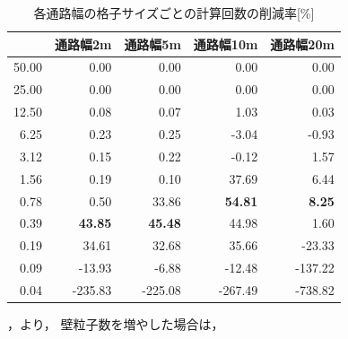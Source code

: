 %
\begin{table}[tb]
  \centering
  \caption{各通路幅の格子サイズごとの計算回数の削減率[\%]}
  \label{tb:5_times_sakugenritu}
    \begin{tabular}{r|r|r|r|r}
    \hline \hline
              & 通路幅2m       & 通路幅5m       & 通路幅10m      & 通路幅20m     \\ \hline
        50.00 & 0.00           & 0.00           & 0.00           & 0.00          \\ \hline
        25.00 & 0.00           & 0.00           & 0.00           & 0.00          \\ \hline
        12.50 & 0.08           & 0.07           & 1.03           & 0.03          \\ \hline
        6.25  & 0.23           & 0.25           & -3.04          & -0.93         \\ \hline
        3.12  & 0.15           & 0.22           & -0.12          & 1.57          \\ \hline
        1.56  & 0.19           & 0.10           & 37.69          & 6.44          \\ \hline
        0.78  & 0.50           & 33.86          & \textbf{54.81} & \textbf{8.25} \\ \hline
        0.39  & \textbf{43.85} & \textbf{45.48} & 44.98          & 1.60          \\ \hline
        0.19  & 34.61          & 32.68          & 35.66          & -23.33        \\ \hline
        0.09  & -13.93         & -6.88          & -12.48         & -137.22       \\ \hline
        0.04  & -235.83        & -225.08        & -267.49        & -738.82       \\ \hline
    \end{tabular}
\end{table}

，より，
壁粒子数を増やした場合は，

